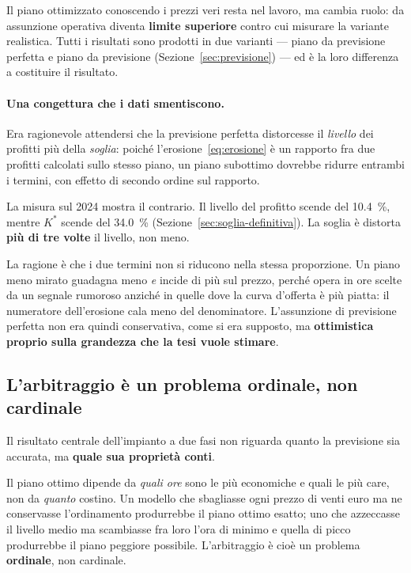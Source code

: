 Il piano ottimizzato conoscendo i prezzi veri resta nel lavoro, ma cambia ruolo: da
assunzione operativa diventa \textbf{limite superiore} contro cui misurare la variante
realistica. Tutti i risultati sono prodotti in due varianti --- piano da previsione perfetta
e piano da previsione (Sezione~\ref{sec:previsione}) --- ed \`e la loro differenza a
costituire il risultato.

\paragraph{Una congettura che i dati smentiscono.} Era ragionevole attendersi che la
previsione perfetta distorcesse il \emph{livello} dei profitti pi\`u della \emph{soglia}:
poich\'e l'erosione~\eqref{eq:erosione} \`e un rapporto fra due profitti calcolati sullo
stesso piano, un piano subottimo dovrebbe ridurre entrambi i termini, con effetto di secondo
ordine sul rapporto.

La misura sul 2024 mostra il contrario. Il livello del profitto scende del
\SI{10,4}{\percent}, mentre $K^*$ scende del \SI{34,0}{\percent}
(Sezione~\ref{sec:soglia-definitiva}). La soglia \`e distorta \textbf{pi\`u di tre volte} il
livello, non meno.

La ragione \`e che i due termini non si riducono nella stessa proporzione. Un piano meno
mirato guadagna meno \emph{e} incide di pi\`u sul prezzo, perch\'e opera in ore scelte da un
segnale rumoroso anzich\'e in quelle dove la curva d'offerta \`e pi\`u piatta: il numeratore
dell'erosione cala meno del denominatore. L'assunzione di previsione perfetta non era quindi
conservativa, come si era supposto, ma \textbf{ottimistica proprio sulla grandezza che la
tesi vuole stimare}.

\subsection{L'arbitraggio \`e un problema ordinale, non cardinale}
\label{sec:ordinale}

Il risultato centrale dell'impianto a due fasi non riguarda quanto la previsione sia
accurata, ma \textbf{quale sua propriet\`a conti}.

Il piano ottimo dipende da \emph{quali ore} sono le pi\`u economiche e quali le pi\`u care,
non da \emph{quanto} costino. Un modello che sbagliasse ogni prezzo di venti euro ma ne
conservasse l'ordinamento produrrebbe il piano ottimo esatto; uno che azzeccasse il livello
medio ma scambiasse fra loro l'ora di minimo e quella di picco produrrebbe il piano peggiore
possibile. L'arbitraggio \`e cio\`e un problema \textbf{ordinale}, non cardinale.

